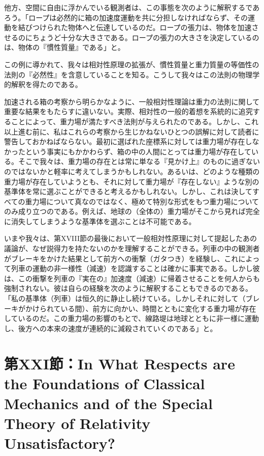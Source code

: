 \documentclass[a4paper,11pt,openany]{ltjsbook}
\begin{document}
他方、空間に自由に浮かんでいる観測者は、この事態を次のように解釈するであろう。「ロープは必然的に箱の加速度運動を共に分担しなければならず、その運動を結びつけられた物体へと伝達しているのだ。ロープの張力は、物体を加速させるのにちょうど十分な大きさである。ロープの張力の大きさを決定しているのは、物体の『慣性質量』である」と。

この例に導かれて、我々は相対性原理の拡張が、慣性質量と重力質量の等価性の法則の『必然性』を含意していることを知る。こうして我々はこの法則の物理学的解釈を得たのである。

加速される箱の考察から明らかなように、一般相対性理論は重力の法則に関して重要な結果をもたらすに違いない。実際、相対性の一般的着想を系統的に追究することによって、重力場が満たすべき法則が与えられたのである。しかし、これ以上進む前に、私はこれらの考察から生じかねないひとつの誤解に対して読者に警告しておかねばならない。最初に選ばれた座標系に対しては重力場が存在しなかったという事実にもかかわらず、箱の中の人間にとっては重力場が存在している。そこで我々は、重力場の存在とは常に単なる『見かけ上』のものに過ぎないのではないかと軽率に考えてしまうかもしれない。あるいは、どのような種類の重力場が存在していようとも、それに対して重力場が『存在しない』ような別の基準体を常に選ぶことができると考えるかもしれない。しかし、これは決してすべての重力場について真なのではなく、極めて特別な形式をもつ重力場についてのみ成り立つのである。例えば、地球の（全体の）重力場がそこから見れば完全に消失してしまうような基準体を選ぶことは不可能である。

いまや我々は、第XVIII節の最後において一般相対性原理に対して提起したあの議論が、なぜ説得力を持たないのかを理解することができる。列車の中の観測者がブレーキをかけた結果として前方への衝撃（ガタつき）を経験し、これによって列車の運動の非一様性（減速）を認識することは確かに事実である。しかし彼は、この衝撃を列車の『実在の』加速度（減速）に帰着させることを何人からも強制されない。彼は自らの経験を次のように解釈することもできるのである。「私の基準体（列車）は恒久的に静止し続けている。しかしそれに対して（ブレーキがかけられている間）、前方に向かい、時間とともに変化する重力場が存在しているのだ。この重力場の影響のもとで、線路堤は地球とともに非一様に運動し、後方への本来の速度が連続的に減殺されていくのである」と。


\clearpage
\chapter{第XXI節：In What Respects are the Foundations of Classical Mechanics and of the Special Theory of Relativity Unsatisfactory?}
\end{document}
